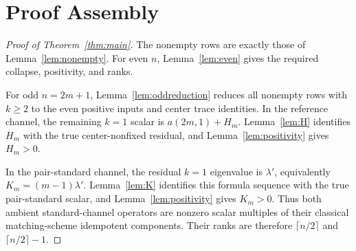 \section{Proof Assembly}\label{sec:assembly}

\begin{proof}[Proof of Theorem~\ref{thm:main}]
The nonempty rows are exactly those of Lemma~\ref{lem:nonempty}.  For even $n$, Lemma~\ref{lem:even} gives the required
collapse, positivity, and ranks.

For odd $n=2m+1$, Lemma~\ref{lem:oddreduction} reduces all nonempty rows with $k\ge2$ to the even positive inputs and
center trace identities.  In the reference channel, the remaining $k=1$ scalar is $a(2m,1)+H_m$.
Lemma~\ref{lem:H} identifies $H_m$ with the true center-nonfixed residual, and Lemma~\ref{lem:positivity} gives
$H_m>0$.

In the pair-standard channel, the residual $k=1$ eigenvalue is $\lambda'$, equivalently $K_m=(m-1)\lambda'$.
Lemma~\ref{lem:K} identifies this formula sequence with the true pair-standard scalar, and
Lemma~\ref{lem:positivity} gives $K_m>0$.  Thus both ambient standard-channel operators are nonzero scalar multiples of
their classical matching-scheme idempotent components.  Their ranks are therefore $\lceil n/2\rceil$ and
$\lceil n/2\rceil-1$.
\end{proof}
